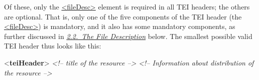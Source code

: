 Of these, only the \hyperref[TEI.fileDesc]{<fileDesc>} element is required in all TEI headers; the others are optional. That is, only one of the five components of the TEI header (the \hyperref[TEI.fileDesc]{<fileDesc>}) is mandatory, and it also has some mandatory components, as further discussed in \textit{\hyperref[HD2]{2.2.\ The File Description}} below. The smallest possible valid TEI header thus looks like this: \par\bgroup{}\exampleFont \begin{shaded}\noindent\mbox{}{<\textbf{teiHeader}>}\mbox{}\newline 
{}\mbox{}\newline 
\hspace*{1em}\mbox{}\newline 
\hspace*{1em}\hspace*{1em}\mbox{}\newline 
\textit{<!-- title of the resource -->}\mbox{}\newline 
\hspace*{1em}\hspace*{1em}\mbox{}\newline 
\hspace*{1em}\mbox{}\newline 
\hspace*{1em}\mbox{}\newline 
\hspace*{1em}\hspace*{1em}\mbox{}\newline 
\textit{<!-- Information about distribution of the resource -->}\mbox{}\newline 
\hspace*{1em}\hspace*{1em}\mbox{}\newline 

\end{shaded}

